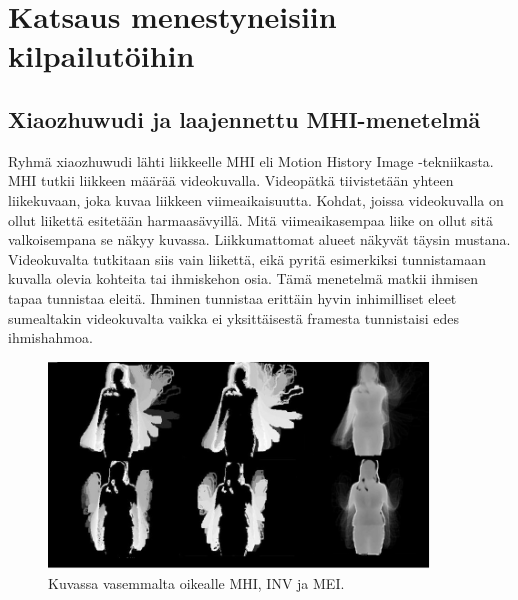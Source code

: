 \section {Katsaus menestyneisiin kilpailutöihin}

\subsection{Xiaozhuwudi ja laajennettu MHI-menetelmä}
Ryhmä xiaozhuwudi lähti liikkeelle MHI eli Motion History Image -tekniikasta. \citep {6239179} MHI tutkii liikkeen määrää videokuvalla.
Videopätkä tiivistetään yhteen liikekuvaan, joka kuvaa liikkeen viimeaikaisuutta. Kohdat, joissa videokuvalla on ollut
liikettä esitetään harmaasävyillä. Mitä viimeaikasempaa liike on ollut sitä valkoisempana se näkyy kuvassa. Liikkumattomat
alueet näkyvät täysin mustana. Videokuvalta tutkitaan siis vain liikettä, eikä pyritä esimerkiksi tunnistamaan kuvalla olevia kohteita
tai ihmiskehon osia. Tämä menetelmä matkii ihmisen tapaa tunnistaa eleitä. Ihminen tunnistaa erittäin hyvin inhimilliset eleet  
sumealtakin videokuvalta vaikka ei yksittäisestä framesta tunnistaisi edes ihmishahmoa. \citep {910878}  \\

\begin{figure}[htb]
  \begin{center}
    \includegraphics[width=0.9\textwidth]{mhi_ex.jpg}
    \caption{Kuvassa vasemmalta oikealle MHI, INV ja MEI. \citep {6239179}}
    \label{fig:mhiinvmei}
  \end{center}
\end{figure}

